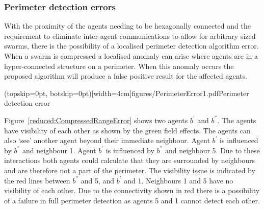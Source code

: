 \documentclass{ieeeaccess}
\begin{document}

\subsubsection{Perimeter detection errors\label{section:PerimeterErrorLocalisation}}
With the proximity of the agents needing to be hexagonally connected and the requirement to eliminate inter-agent communications to allow for arbitrary sized swarms, there is the possibility of a localised perimeter detection algorithm error. When a swarm is compressed a localised anomaly can arise where agents are in a hyper-connected structure on a perimeter. When this anomaly occurs the proposed algorithm will produce a false positive result for the affected agents. 


\Figure[t!](topskip=0pt, botskip=0pt)[width=4cm]{figures/PerimeterError1.pdf}{Perimeter detection error\label{reduced:CompressedRangeError}}

Figure~\ref{reduced:CompressedRangeError} shows two agents $b^{'}$ and $b^{''}$. The agents have visibility of each other as shown by the green field effects. The agents can also `see' another agent beyond their immediate neighbour. Agent $b^{'}$ is influenced by $b^{''}$ and neighbour 1. Agent $b^{'}$ is influenced by $b^{''}$ and neighbour 5. Due to these interactions both agents could calculate that they are surrounded by neighbours and are therefore not a part of the perimeter. The visibility issue is indicated by the red lines between $b^{''}$ and 5, and $b^{'}$ and 1. Neighbours 1 and 5 have no visibility of each other. Due to the connectivity shown in red there is a possibility of a failure in full perimeter detection as agents 5 and 1 cannot detect each other. 
\end{document}
